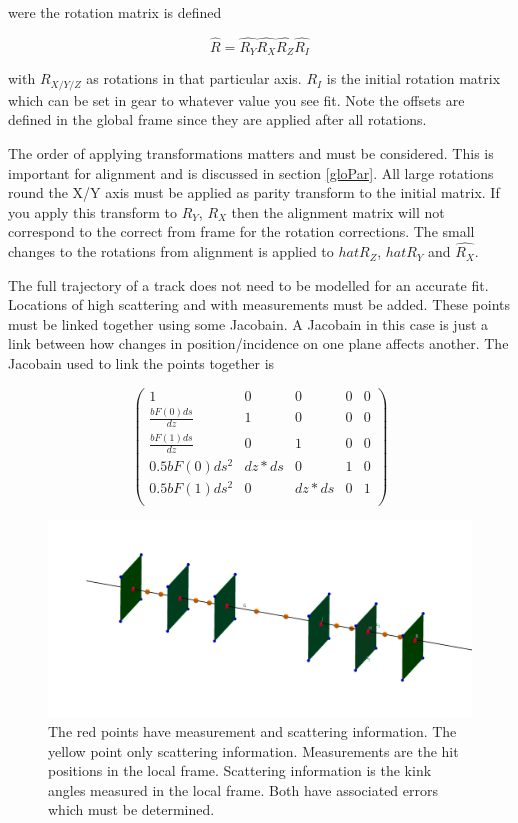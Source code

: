 were the rotation matrix is defined

\begin{equation}
 \hat{R} = \hat{R_Y}\hat{R_X}\hat{R_Z}\hat{R_I}
\end{equation}

with $R_{X/Y/Z}$ as rotations in that particular axis. $R_I$ is the initial rotation matrix which can be set in gear to whatever value you see fit. Note the offsets are defined in the global frame since they are applied after all rotations. 

The order of applying transformations matters and must be considered. This is important for alignment and is discussed in section \ref{gloPar}. All large rotations round the X/Y axis must be applied as parity transform to the initial matrix. If you apply this transform to $R_Y$, $R_X$ then the alignment matrix will not correspond to the correct from frame for the rotation corrections. The small changes to the rotations from alignment is applied to $hat{R_Z}$,  $hat{R_Y}$ and $\hat{R_X}$.


The full trajectory of a track does not need to be modelled for an accurate fit. Locations of high scattering and with measurements must be added. These points must be linked together using some Jacobain. A Jacobain in this case is just a link between how changes in position/incidence on one plane affects another. The Jacobain used to link the points together is 

\[ \left( \begin{array}{cccccc}
1                            & 0       & 0        & 0 & 0  \\
\frac{bF(0)ds}{dz} & 1        & 0        & 0 & 0  \\
\frac{bF(1)ds}{dz} & 0        & 1        & 0 & 0  \\
0.5bF(0)ds^2        & dz*ds & 0        & 1 & 0      \\  
0.5bF(1)ds^2        & 0        & dz*ds & 0 &  1       \\  
  \label{eq:PC}
\end{array}
 \right)\] 

\begin{figure}[H]
\centering
\includegraphics[width=1.0\linewidth]{figures/meas-scat-jac-link.png}
\caption{The red points have measurement and scattering information. The yellow point only scattering information. Measurements are the hit positions in the local frame. Scattering information is the kink angles measured in the local frame. Both have associated errors which must be determined.}
\label{fig:LinkJac}
\end{figure}


